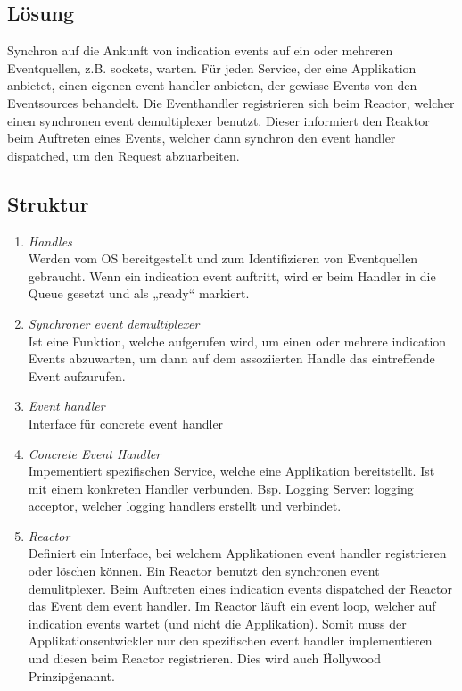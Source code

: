 \subsection*{Lösung}

Synchron auf die Ankunft von indication events auf ein oder mehreren Eventquellen, z.B. sockets, warten.
Für jeden Service, der eine Applikation anbietet, einen eigenen event handler anbieten, der gewisse Events von den Eventsources behandelt. Die Eventhandler registrieren sich beim Reactor, welcher einen synchronen event demultiplexer benutzt. Dieser informiert den Reaktor beim Auftreten eines Events, welcher dann synchron den event handler dispatched, um den Request abzuarbeiten.


\subsection*{Struktur}

\begin{enumerate}
	\item \emph{Handles}\\
	Werden vom OS bereitgestellt und zum Identifizieren von Eventquellen gebraucht. Wenn ein indication event auftritt, wird er beim Handler in die Queue gesetzt und als „ready“ markiert.
	\item \emph{Synchroner event demultiplexer}\\
	Ist eine Funktion, welche aufgerufen wird, um einen oder mehrere indication Events abzuwarten, um dann auf dem assoziierten Handle das eintreffende Event aufzurufen.
	\item \emph{Event handler}\\
	Interface für concrete event handler
	\item \emph{Concrete Event Handler}\\
	Impementiert spezifischen Service, welche eine Applikation bereitstellt. Ist mit einem konkreten Handler verbunden. Bsp. Logging Server: logging acceptor, welcher logging handlers erstellt und verbindet.
	\item \emph{Reactor}\\
	Definiert ein Interface, bei welchem Applikationen event handler registrieren oder löschen können. Ein Reactor benutzt den synchronen event demulitplexer. Beim Auftreten eines indication events dispatched der Reactor das Event dem event handler. Im Reactor läuft ein event loop, welcher auf indication events wartet (und nicht die Applikation). Somit muss der Applikationsentwickler nur den spezifischen event handler implementieren und diesen beim Reactor registrieren. Dies wird auch \"Hollywood Prinzip\" genannt.
\end{enumerate}


